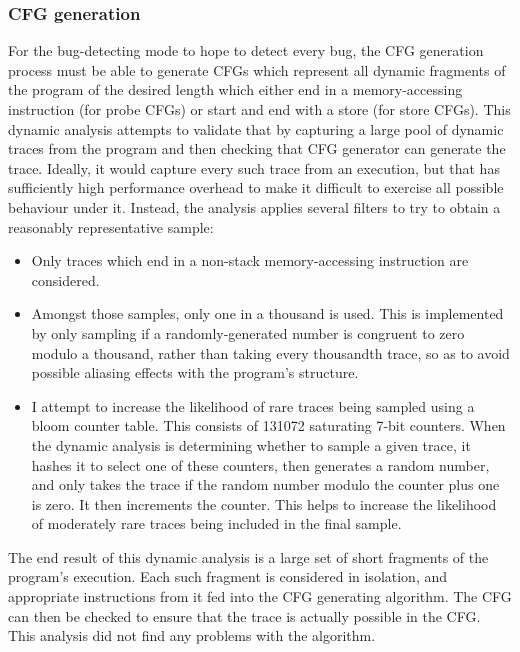 \subsubsection{CFG generation}

For the bug-detecting mode to hope to detect every bug, the CFG
generation process must be able to generate CFGs which represent all
dynamic fragments of the program of the desired length which either
end in a memory-accessing instruction (for probe CFGs) or start and
end with a store (for store CFGs).  This dynamic analysis attempts to
validate that by capturing a large pool of dynamic traces from the
program and then checking that CFG generator can generate the trace.
Ideally, it would capture every such trace from an execution, but that
has sufficiently high performance overhead to make it difficult to
exercise all possible behaviour under it.  Instead,
the analysis applies several filters to try to obtain a reasonably
representative sample:

\begin{itemize}
\item
  Only traces which end in a non-stack memory-accessing instruction
  are considered.
\item
  Amongst those samples, only one in a thousand is used.  This is
  implemented by only sampling if a randomly-generated number is
  congruent to zero modulo a thousand, rather than taking every
  thousandth trace, so as to avoid possible aliasing effects with the
  program's structure.
\item
  I attempt to increase the likelihood of rare traces being sampled
  using a bloom counter table.  This consists of 131072 saturating
  7-bit counters.  When the dynamic analysis is determining whether to
  sample a given trace, it hashes it to select one of these counters,
  then generates a random number, and only takes the trace if the
  random number modulo the counter plus one is zero.  It then
  increments the counter.  This helps to increase the likelihood of
  moderately rare traces being included in the final sample.
\end{itemize}

The end result of this dynamic analysis is a large set of short
fragments of the program's execution.  Each such fragment is
considered in isolation, and appropriate instructions from it fed into
the CFG generating algorithm.  The CFG can then be checked to ensure
that the trace is actually possible in the CFG.  This analysis did not
find any problems with the algorithm.

